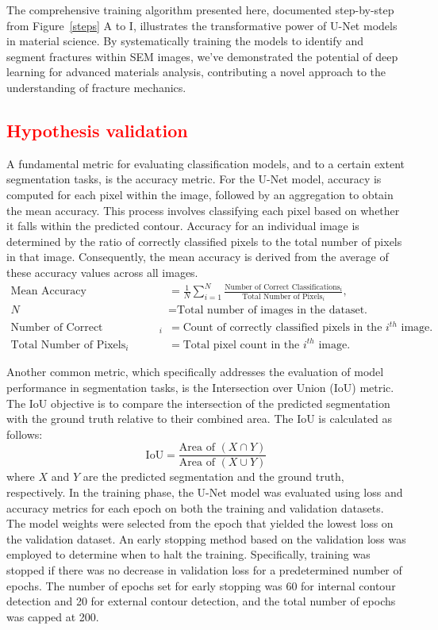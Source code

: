 \documentclass[preprint,12pt]{elsarticle}
\begin{document}
The comprehensive training algorithm presented here, documented step-by-step from Figure~\ref{steps} A to I, illustrates the transformative power of U-Net models in material science. By systematically training the models to identify and segment fractures within SEM images, we've demonstrated the potential of deep learning for advanced materials analysis, contributing a novel approach to the understanding of fracture mechanics.




\clearpage

\subsection{\textcolor{red}{Hypothesis validation}}
A fundamental metric for evaluating classification models, and to a certain extent segmentation tasks, is the accuracy metric. For the U-Net model, accuracy is computed for each pixel within the image, followed by an aggregation to obtain the mean accuracy. This process involves classifying each pixel based on whether it falls within the predicted contour. Accuracy for an individual image is determined by the ratio of correctly classified pixels to the total number of pixels in that image. Consequently, the mean accuracy is derived from the average of these accuracy values across all images.
\begin{align*}
\text{Mean Accuracy} & = \frac{1}{N} \sum_{i=1}^{N} \frac{\text{Number of Correct Classifications}_i}{\text{Total Number of Pixels}_i}, \\
N & = \text{Total number of images in the dataset.} \\
\text{Number of Correct Classifications}_i & = \text{Count of correctly classified pixels in the $i^{th}$ image.} \\
\text{Total Number of Pixels}_i & = \text{Total pixel count in the $i^{th}$ image.}
\end{align*}

Another common metric, which specifically addresses the evaluation of model performance in segmentation tasks, is the Intersection over Union (IoU) metric. The IoU objective is to compare the intersection of the predicted segmentation with the ground truth relative to their combined area. The IoU is calculated as follows:
\begin{equation}
\text{IoU} = \frac{\text{Area of } (X \cap Y)}{\text{Area of } (X \cup Y)}
\end{equation}
where $X$ and $Y$ are the predicted segmentation and the ground truth, respectively.
In the training phase, the U-Net model was evaluated using loss and accuracy metrics for each epoch on both the training and validation datasets.
The model weights were selected from the epoch that yielded the lowest loss on the validation dataset.
An early stopping method based on the validation loss was employed to determine when to halt the training.
Specifically, training was stopped if there was no decrease in validation loss for a predetermined number of epochs.
The number of epochs set for early stopping was 60 for internal contour detection and 20 for external contour detection, and the total number of epochs was capped at 200.
\end{document}
